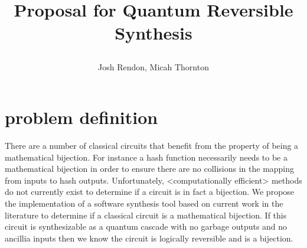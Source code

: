 \documentclass{report}
\title {\author{ Josh Rendon, Micah Thornton} Proposal for Quantum Reversible Synthesis}
\begin{document}
\maketitle{}
\begin{abstract}
\end{abstract}
\section{problem definition}
There are a number of classical circuits that benefit from the property of being a mathematical bijection. For instance a hash function necessarily needs
to be a mathematical bijection in order to ensure there are no collisions in the mapping from inputs to hash outputs. 
Unfortunately, <computationally efficient> methods do not currently exist to determine if a circuit is in fact a bijection.
We propose the implementation of a software synthesis tool based on current work in the literature to determine if a classical circuit is a mathematical bijection.
If this circuit is synthesizable as a quantum cascade with no garbage outputs and no ancillia inputs then we know the circuit is logically reversible and is a bijection.
\section{ }
\end{document}
